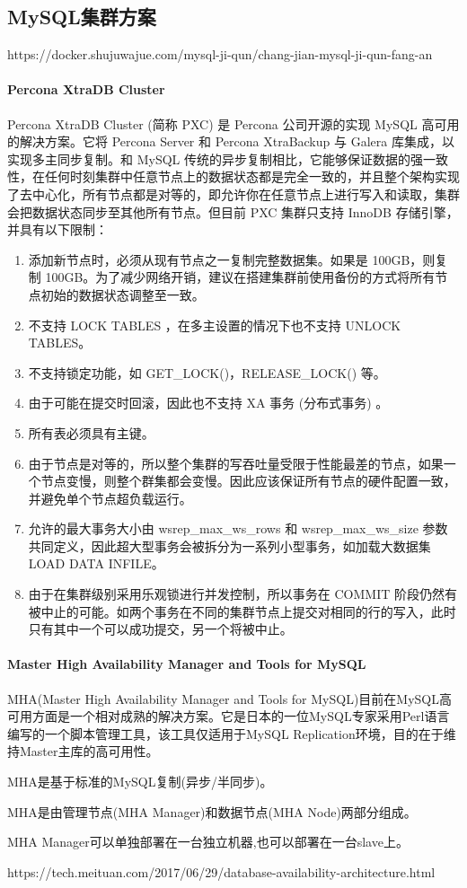 \documentclass[../../../interview-questions.tex]{subfiles}
\begin{document}
\subsection{MySQL集群方案}

https://docker.shujuwajue.com/mysql-ji-qun/chang-jian-mysql-ji-qun-fang-an

\paragraph{Percona XtraDB Cluster }

Percona XtraDB Cluster (简称 PXC) 是 Percona 公司开源的实现 MySQL 高可用的解决方案。它将 Percona Server 和 Percona XtraBackup 与 Galera 库集成，以实现多主同步复制。和 MySQL 传统的异步复制相比，它能够保证数据的强一致性，在任何时刻集群中任意节点上的数据状态都是完全一致的，并且整个架构实现了去中心化，所有节点都是对等的，即允许你在任意节点上进行写入和读取，集群会把数据状态同步至其他所有节点。但目前 PXC 集群只支持 InnoDB 存储引擎，并具有以下限制：

\begin{enumerate}
    \item {添加新节点时，必须从现有节点之一复制完整数据集。如果是 100GB，则复制 100GB。为了减少网络开销，建议在搭建集群前使用备份的方式将所有节点初始的数据状态调整至一致。}
    \item {不支持 LOCK TABLES ，在多主设置的情况下也不支持 UNLOCK TABLES。}
    \item {不支持锁定功能，如 GET\_LOCK()，RELEASE\_LOCK() 等。}
    \item {由于可能在提交时回滚，因此也不支持 XA 事务 (分布式事务) 。}
    \item {所有表必须具有主键。}
    \item {由于节点是对等的，所以整个集群的写吞吐量受限于性能最差的节点，如果一个节点变慢，则整个群集都会变慢。因此应该保证所有节点的硬件配置一致，并避免单个节点超负载运行。}
    \item {允许的最大事务大小由 wsrep\_max\_ws\_rows 和 wsrep\_max\_ws\_size 参数共同定义，因此超大型事务会被拆分为一系列小型事务，如加载大数据集 LOAD DATA INFILE。}
    \item {由于在集群级别采用乐观锁进行并发控制，所以事务在 COMMIT 阶段仍然有被中止的可能。如两个事务在不同的集群节点上提交对相同的行的写入，此时只有其中一个可以成功提交，另一个将被中止。}
\end{enumerate}

\paragraph{Master High Availability Manager and Tools for MySQL}

MHA(Master High Availability Manager and Tools for MySQL)目前在MySQL高可用方面是一个相对成熟的解决方案。它是日本的一位MySQL专家采用Perl语言编写的一个脚本管理工具，该工具仅适用于MySQL Replication环境，目的在于维持Master主库的高可用性。

MHA是基于标准的MySQL复制(异步/半同步)。

MHA是由管理节点(MHA Manager)和数据节点(MHA Node)两部分组成。

MHA Manager可以单独部署在一台独立机器,也可以部署在一台slave上。

https://tech.meituan.com/2017/06/29/database-availability-architecture.html
\end{document}

